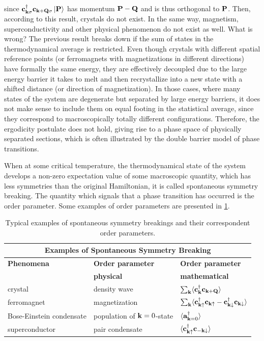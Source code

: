 since ${\bf c}_{{\bf k}\sigma}^\dagger {\bf c}_{{\bf k + Q}\sigma} \ket{{\bf P}}$ has momentum ${\bf P} - {\bf Q}$ and is thus orthogonal to ${\bf P}$. Then, according to this result, crystals do not exist. In the same way, magnetism, superconductivity and other physical phenomenon do not exist as well. What is wrong? The previous result breaks down if the sum of states in the thermodynamical average is restricted. Even though crystals with different spatial reference points (or ferromagnets with magnetizations in different directions) have formally the same energy, they are effectively decoupled due to the large energy barrier it takes to melt and then recrystallize into a new state with a shifted distance (or direction of magnetization). In those cases, where many states of the system are degenerate but separated by large energy barriers, it does not make sense to include them on equal footing in the statistical average, since they correspond to macroscopically totally different configurations. Therefore, the ergodicity postulate does not hold, giving rise to a phase space of physically separated sections, which is often illustrated by the double barrier model of phase transitions. 

When at some critical temperature, the thermodynamical state of the system develops a non-zero expectation value of some macroscopic quantity, which has less symmetries than the original Hamiltonian, it is called spontaneous symmetry breaking. The quantity which signals that a phase transition has occurred is the order parameter. Some examples of order parameters are presented in \cref{order paras table}.

\begin{table}[!h]
\centering
\begin{tabular}{ |p{5cm}||p{5cm}|p{4cm}|  }
 \hline
 \multicolumn{3}{|c|}{Examples of Spontaneous Symmetry Breaking} \\
 \hline
 \textbf{Phenomena} & \textbf{Order parameter} & \textbf{ Order parameter} \\
 & \textbf{ physical } & \textbf{ mathematical }\\
 \hline
 crystal & density wave & $\sum_{{\bf k}} \langle {\bf c}_{{\bf k}}^\dagger {\bf c}_{{\bf k} + {\bf Q}} \rangle $\\
 ferromagnet & magnetization & $\sum_{{\bf k}} \langle {\bf c}_{{\bf k}\uparrow}^\dagger {\bf c}_{{\bf k}\uparrow} - {\bf c}_{{\bf k}\downarrow}^\dagger {\bf c}_{{\bf k}\downarrow} \rangle$\\
 Bose-Einstein condensate & population of ${\bf k}=0$-state & $\langle {\bf a}_{{\bf k} = 0}^\dagger \rangle$\\
 superconductor & pair condensate & $\langle {\bf c}_{{\bf k} \uparrow}^\dagger {\bf c}_{-{\bf k}\downarrow} \rangle$ \\
 \hline
\end{tabular}
 \caption{Typical examples of spontaneous symmetry breakings and their correspondent order parameters. }
 \label{order paras table}
\end{table}

